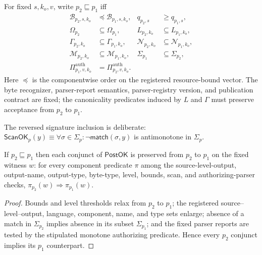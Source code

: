 \begin{definition}
\label{def:policy-refinement}
For fixed \(s,k_o,v\), write \(p_2\sqsubseteq p_1\) iff
\begin{equation}
\begin{aligned}
 \mathcal B_{p_2,s,k_o}&\preceq\mathcal B_{p_1,s,k_o},&
 q_{p_2,s}&\ge q_{p_1,s},\\
 \Omega_{p_2}&\subseteq\Omega_{p_1},&
 L_{p_2,k_o}&\subseteq L_{p_1,k_o},\\
 \Gamma_{p_2,k_o}&\subseteq\Gamma_{p_1,k_o},&
 \mathcal N_{p_2,k_o}&\subseteq\mathcal N_{p_1,k_o},\\
 \mathcal M_{p_2,k_o}&\subseteq\mathcal M_{p_1,k_o},&
 \Sigma_{p_1}&\subseteq\Sigma_{p_2},\\
 \Pi^{\mathrm{auth}}_{p_1,v,k_o}&=
 \Pi^{\mathrm{auth}}_{p_2,v,k_o}.&&
\end{aligned}
\label{eq:policy-refinement}
\end{equation}
Here \(\preceq\) is the componentwise order on the registered resource-bound
vector. The byte recognizer, parser-report semantics, parser-registry version,
and publication contract are fixed; the canonicality predicates induced by
\(L\) and \(\Gamma\) must preserve acceptance from \(p_2\) to \(p_1\).
\end{definition}

The reversed signature inclusion is deliberate:
\(\mathsf{ScanOK}_p(y)\equiv\forall\sigma\in\Sigma_p:
\neg\mathsf{match}(\sigma,y)\) is antimonotone in \(\Sigma_p\).

\begin{lemma}
\label{lem:component-monotone}
If \(p_2\sqsubseteq p_1\) then each conjunct of \(\mathsf{PostOK}\) is preserved
from \(p_2\) to \(p_1\) on the fixed witness \(w\): for every component
predicate \(\pi\) among the source-level-output, output-name, output-type,
byte-type, level, bounds, scan, and authorizing-parser checks,
\(\pi_{p_2}(w)\Rightarrow\pi_{p_1}(w)\).
\end{lemma}

\begin{proof}
Bounds and level thresholds relax from \(p_2\) to \(p_1\); the registered
source--level--output, language, component, name, and type sets enlarge;
absence of a match in \(\Sigma_{p_2}\) implies absence in its subset
\(\Sigma_{p_1}\); and the fixed parser reports are tested by the stipulated
monotone authorizing predicate. Hence every \(p_2\) conjunct implies its
\(p_1\) counterpart.
\end{proof}

